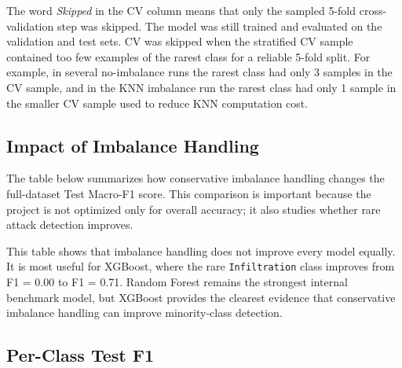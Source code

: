\documentclass[12pt,a4paper]{article}
\begin{document}
The word \textit{Skipped} in the CV column means that only the sampled 5-fold cross-validation step was skipped. The model was still trained and evaluated on the validation and test sets. CV was skipped when the stratified CV sample contained too few examples of the rarest class for a reliable 5-fold split. For example, in several no-imbalance runs the rarest class had only 3 samples in the CV sample, and in the KNN imbalance run the rarest class had only 1 sample in the smaller CV sample used to reduce KNN computation cost.

\subsection{Impact of Imbalance Handling}

The table below summarizes how conservative imbalance handling changes the full-dataset Test Macro-F1 score. This comparison is important because the project is not optimized only for overall accuracy; it also studies whether rare attack detection improves.

\begin{table}[H]
\centering
\caption{Effect of imbalance handling on Test Macro-F1.}
\scriptsize
\setlength{\tabcolsep}{3pt}
\end{table}

This table shows that imbalance handling does not improve every model equally. It is most useful for XGBoost, where the rare \texttt{Infiltration} class improves from F1 = 0.00 to F1 = 0.71. Random Forest remains the strongest internal benchmark model, but XGBoost provides the clearest evidence that conservative imbalance handling can improve minority-class detection.

\subsection{Per-Class Test F1}
\end{document}
